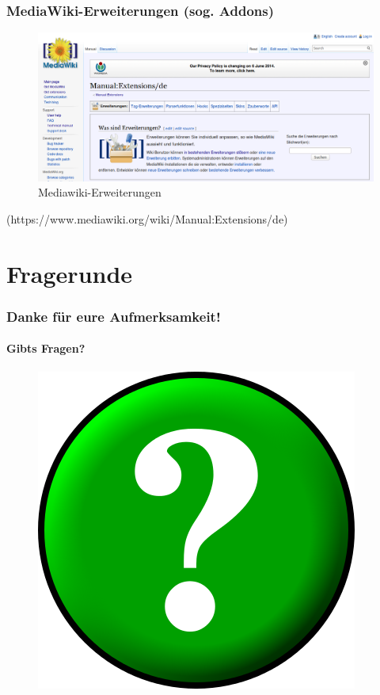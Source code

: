 \documentclass[handout]{beamer}   %
\begin{document}
\begin{frame}
  \frametitle{MediaWiki-Erweiterungen (sog. Addons)}

	\begin{figure}[tbph]
		\centering
		\includegraphics[width=\linewidth]{Mediawiki-Extensions}
		\caption[Mediawiki-Erweiterungen]{Mediawiki-Erweiterungen}
		\label{fig:Mediawiki-Extensions}
	\end{figure}

  (https://www.mediawiki.org/wiki/Manual:Extensions/de)

\end{frame}

\section{Fragerunde}

\begin{frame}
  \frametitle{Danke für eure Aufmerksamkeit!}
  \framesubtitle{Gibts Fragen?}

  \begin{figure}
      \includegraphics[scale=0.5]{Circle-question_400x400.png}
      \label{fig:Fragezeichenschild}
  \end{figure}

\end{frame}
\end{document}
